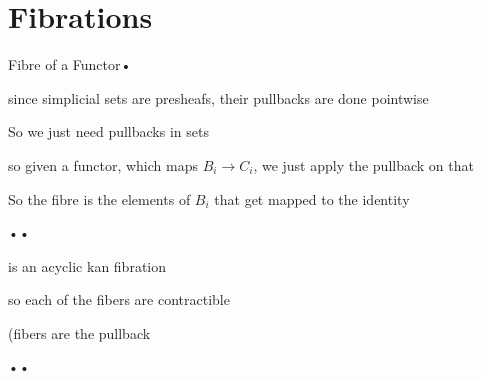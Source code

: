 \section{Fibrations}




\begin{definition}{Fibre of a Functor}{•}

\end{definition}
\begin{defframe}

since simplicial sets are presheafs, their pullbacks are done pointwise

So we just need pullbacks in sets

so given a functor, which maps $B_i \to C_i$, we just apply the pullback on that

So the fibre is the elements of $B_i$ that get mapped to the identity


\end{defframe}





\begin{prop}{•}{•}

is an acyclic kan fibration

so each of the fibers are contractible

(fibers are the pullback
\end{prop}



\begin{lemma}{•}{•}

\end{lemma}
\begin{proof-lemma}






\end{proof-lemma}




